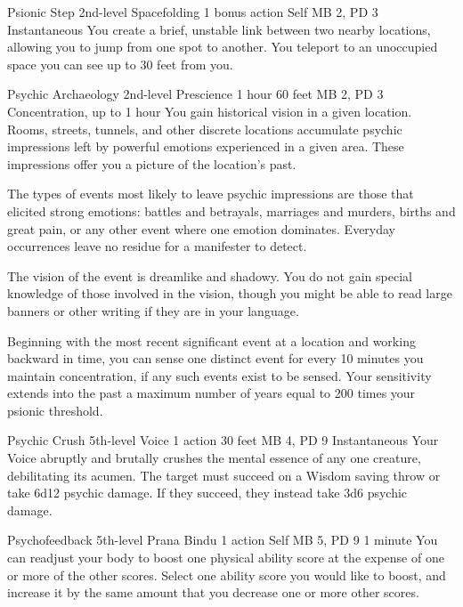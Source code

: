 \DndPowerHeader%
  {Psionic Step}
  {2nd-level Spacefolding}
  {1 bonus action}
  {Self}
  {MB 2, PD 3}
  {Instantaneous}
You create a brief, unstable link between two nearby locations,
allowing you to jump from one spot to another.
You teleport to an unoccupied space you can see
up to 30 feet from you.

\DndPowerHeader%
  {Psychic Archaeology}
  {2nd-level Prescience}
  {1 hour}
  {60 feet}
  {MB 2, PD 3}
  {Concentration, up to 1 hour}
  You gain historical vision in a given location.
  Rooms, streets, tunnels, and other discrete locations
  accumulate psychic impressions left by powerful emotions
  experienced in a given area.
  These impressions offer you a picture of the location's past.

  The types of events most likely to leave
  psychic impressions are those that elicited strong emotions:
  battles and betrayals,
  marriages and murders,
  births and great pain,
  or any other event where one emotion dominates.
  Everyday occurrences leave no residue for a manifester to detect.
  
  The vision of the event is dreamlike and shadowy.
  You do not gain special knowledge of those involved in the vision,
  though you might be able to read large banners
  or other writing if they are in your language.
  
  Beginning with the most recent significant event
  at a location and working backward in time,
  you can sense one distinct event for every 10 minutes
  you maintain concentration,
  if any such events exist to be sensed.
  Your sensitivity extends into the past
  a maximum number of years equal to
  200 times your psionic threshold.

\DndPowerHeader%
  {Psychic Crush}
  {5th-level Voice}
  {1 action}
  {30 feet}
  {MB 4, PD 9}
  {Instantaneous}
Your Voice abruptly and brutally crushes the mental essence
of any one creature, debilitating its acumen.
The target must succeed on a Wisdom saving throw
or take 6d12 psychic damage.
If they succeed, they instead take 3d6 psychic damage.

\DndPowerHeader%
  {Psychofeedback}
  {5th-level Prana Bindu}
  {1 action}
  {Self}
  {MB 5, PD 9}
  {1 minute}
  You can readjust your body to boost one
  physical ability score at the expense of one
  or more of the other scores.
  Select one ability score you would like to boost,
  and increase it by the same amount that you decrease
  one or more other scores.

